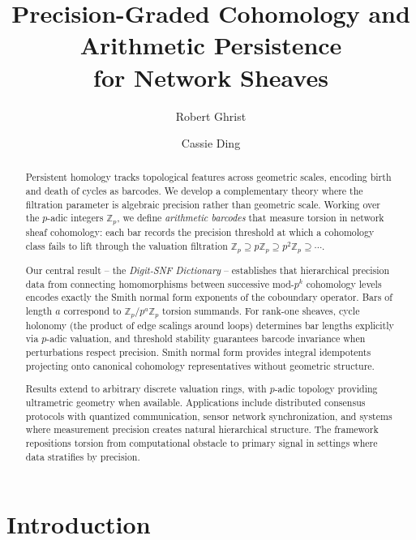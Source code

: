 \documentclass[11pt]{amsart}
\title[Precision-Graded Cohomology]{Precision-Graded Cohomology and Arithmetic Persistence \\ for Network Sheaves}
\author{Robert Ghrist}
\author{Cassie Ding}
\theoremstyle{plain}
\theoremstyle{definition}
\begin{document}
\begin{abstract}
Persistent homology tracks topological features across geometric scales, encoding birth and death of cycles as barcodes. We develop a complementary theory where the filtration parameter is algebraic precision rather than geometric scale. Working over the $p$-adic integers $\mathbb{Z}_p$, we define \emph{arithmetic barcodes} that measure torsion in network sheaf cohomology: each bar records the precision threshold at which a cohomology class fails to lift through the valuation filtration $\mathbb{Z}_p \supseteq p\mathbb{Z}_p \supseteq p^2\mathbb{Z}_p \supseteq \cdots$.

Our central result -- the \emph{Digit-SNF Dictionary} -- establishes that hierarchical precision data from connecting homomorphisms between successive mod-$p^k$ cohomology levels encodes exactly the Smith normal form exponents of the coboundary operator. Bars of length $a$ correspond to $\mathbb{Z}_p/p^a\mathbb{Z}_p$ torsion summands. For rank-one sheaves, cycle holonomy (the product of edge scalings around loops) determines bar lengths explicitly via $p$-adic valuation, and threshold stability guarantees barcode invariance when perturbations respect precision. Smith normal form provides integral idempotents projecting onto canonical cohomology representatives without geometric structure.

Results extend to arbitrary discrete valuation rings, with $p$-adic topology providing ultrametric geometry when available. Applications include distributed consensus protocols with quantized communication, sensor network synchronization, and systems where measurement precision creates natural hierarchical structure. The framework repositions torsion from computational obstacle to primary signal in settings where data stratifies by precision.
\end{abstract}


\maketitle

\section{Introduction}
\label{sec:intro}
\end{document}
